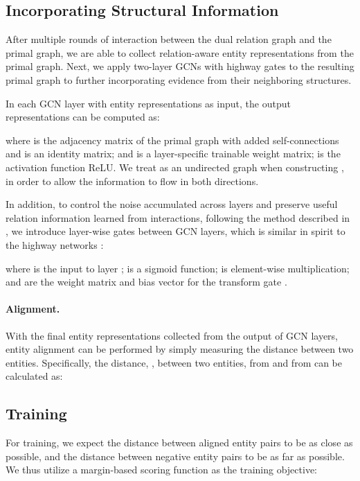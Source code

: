 \documentclass{article}
\begin{document}
\subsection{Incorporating Structural Information}
After multiple rounds of interaction between the dual relation graph and the primal graph, 
we are able to collect relation-aware entity representations from the primal graph. Next, we apply two-layer GCNs \cite{Kipf2016Semi} with highway gates to the resulting primal graph to further incorporating evidence from their neighboring structures. 

In each GCN layer  with entity representations  as input, the output representations  can be computed as:

where  is the adjacency matrix of the primal graph  with added self-connections and  is an identity matrix;  and  is a layer-specific trainable weight matrix;  is the activation function ReLU. We treat  as an undirected graph when constructing , in order to allow the information to flow in both directions.

In addition, to control the noise accumulated across layers and preserve useful relation information learned from interactions, following the method described in \cite{Rahimi2018Semi}, we introduce layer-wise gates between GCN layers, which is similar in spirit to the highway networks \cite{Srivastava2015Highway}:

\vspace{-2mm}

where  is the input to layer ;  is a sigmoid function;  is element-wise multiplication;  
and  
are the weight matrix and bias vector for the transform gate .


\paragraph{Alignment.} With the final entity representations  collected from the output of GCN layers, entity alignment can be performed by simply measuring the distance between
two entities. Specifically, the distance, , between two entities,  from 
and  from  can be calculated as:



\subsection{Training\label{prediction}}
For training, we expect the distance between aligned entity pairs to be as close as possible, and the distance
between negative entity pairs to be as far as possible. We thus utilize a margin-based scoring function as the
training objective:
\end{document}
